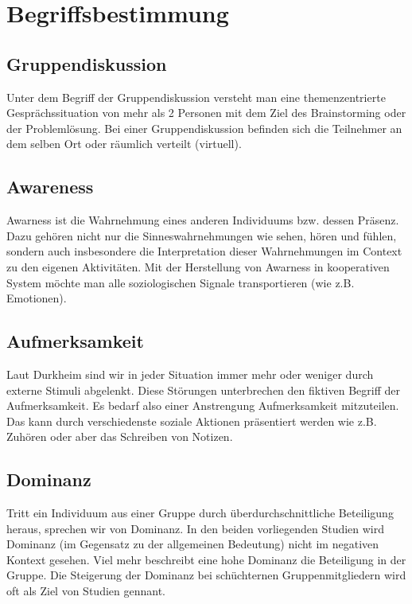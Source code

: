 \documentclass{seminarvorlage}
\begin{document}

\section{Begriffsbestimmung}
\subsection{Gruppendiskussion}
Unter dem Begriff der Gruppendiskussion versteht man eine themenzentrierte
Gesprächssituation von mehr als 2 Personen mit dem Ziel des Brainstorming oder
der Problemlösung. Bei einer Gruppendiskussion befinden sich die Teilnehmer an
dem selben Ort oder räumlich verteilt (virtuell).

\subsection{Awareness}
Awarness ist die Wahrnehmung eines anderen Individuums bzw. dessen Präsenz. Dazu
gehören nicht nur die Sinneswahrnehmungen wie sehen, hören und fühlen, sondern
auch insbesondere die Interpretation dieser Wahrnehmungen im Context zu den
eigenen Aktivitäten.
Mit der Herstellung von Awarness in kooperativen System möchte man alle
soziologischen Signale transportieren (wie z.B. Emotionen).

\subsection{Aufmerksamkeit}
Laut Durkheim \cite{Dur1974} sind wir in jeder Situation immer mehr oder weniger
durch externe Stimuli abgelenkt. Diese Störungen unterbrechen den fiktiven
Begriff der Aufmerksamkeit. Es bedarf also einer Anstrengung Aufmerksamkeit
mitzuteilen. Das kann durch verschiedenste soziale Aktionen präsentiert werden
wie z.B. Zuhören oder aber das Schreiben von Notizen.

\subsection{Dominanz}
Tritt ein Individuum aus einer Gruppe durch überdurchschnittliche Beteiligung
heraus, sprechen wir von Dominanz. In den beiden vorliegenden Studien wird
Dominanz (im Gegensatz zu der allgemeinen Bedeutung) nicht im negativen Kontext
gesehen. Viel mehr beschreibt eine hohe Dominanz die Beteiligung in der Gruppe.
Die Steigerung der Dominanz bei schüchternen Gruppenmitgliedern wird oft als
Ziel von Studien gennant.
\end{document}
